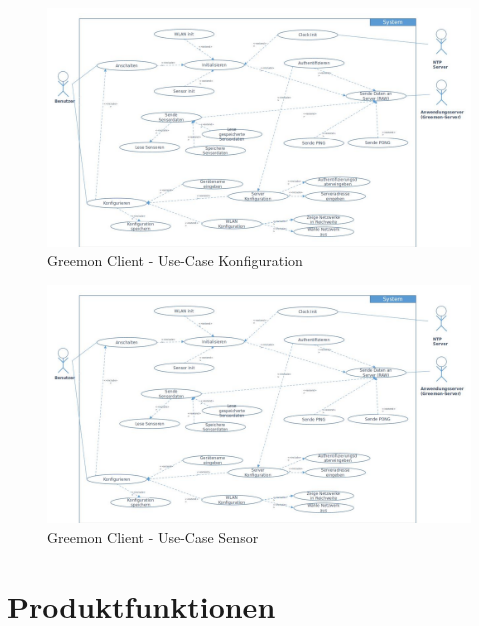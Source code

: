 \documentclass[pointlessnumbers]{scrartcl}
\begin{document}
\begin{figure}[htbp] 
  \centering
     \includegraphics[width=1\textwidth]{images/usecase_client_allgemein.jpg}
  \caption{Greemon Client - Use-Case Konfiguration}
  \label{fig:usecase_client_config}
\end{figure}

\begin{figure}[htbp] 
  \centering
     \includegraphics[width=1\textwidth]{images/usecase_client_allgemein.jpg}
  \caption{Greemon Client - Use-Case Sensor}
  \label{fig:usecase_client_sensor}
\end{figure}
\section{Produktfunktionen}

\newpage
\end{document}
